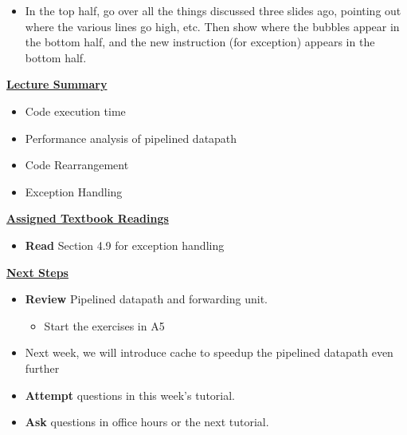\begin{frame}[fragile]
\BNotes\ifnum{}
\begin{itemize}
\item In the top half, go over all the things discussed three slides ago, pointing
	out where the various lines go high, etc.  Then show where
	the bubbles appear in the bottom half, and the new instruction
	(for exception) appears in the bottom half.
\end{itemize}
\fi\ENotes
\end{frame}

\begin{frame}[fragile]
 \underline{\textbf{Lecture Summary}}
 \begin{itemize}
 \item Code execution time 
 \item Performance analysis of pipelined datapath
\item Code Rearrangement
\item Exception Handling



\end{itemize}
 \underline{\textbf{Assigned Textbook Readings}}
\begin{itemize}
     \item \textbf{Read} Section 4.9 for exception handling
     \end{itemize}
    \underline{\textbf{Next Steps}}
    \begin{itemize}
     \item \textbf{Review} Pipelined datapath and forwarding unit. 
\begin{itemize}
    \item Start the exercises in A5
\end{itemize}
\item Next week, we will introduce cache to speedup the pipelined datapath even further
\item \textbf{Attempt} questions in this week's tutorial. 
    \item \textbf{Ask} questions in office hours or the next tutorial.
 \end{itemize}

\end{frame}
